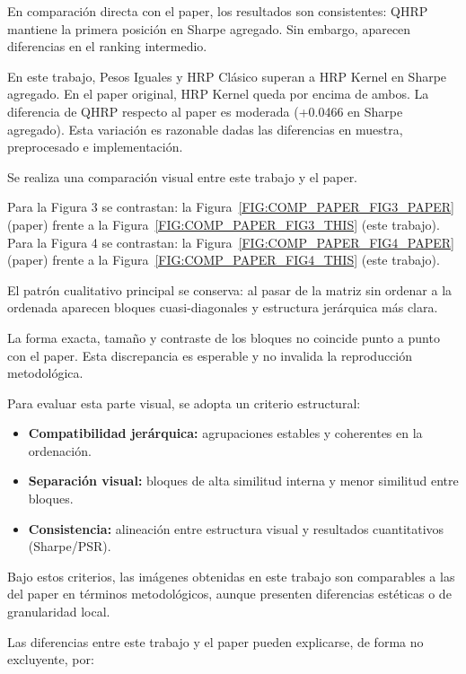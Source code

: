 En comparación directa con el paper, los resultados son consistentes: QHRP mantiene la primera posición en Sharpe agregado. Sin embargo, aparecen diferencias en el ranking intermedio.

En este trabajo, Pesos Iguales y HRP Clásico superan a HRP Kernel en Sharpe agregado. En el paper original, HRP Kernel queda por encima de ambos. La diferencia de QHRP respecto al paper es moderada (+0.0466 en Sharpe agregado). Esta variación es razonable dadas las diferencias en muestra, preprocesado e implementación.

Se realiza una comparación visual entre este trabajo y el paper.

Para la Figura 3 se contrastan: la Figura~\ref{FIG:COMP_PAPER_FIG3_PAPER} (paper) frente a la Figura~\ref{FIG:COMP_PAPER_FIG3_THIS} (este trabajo). Para la Figura 4 se contrastan: la Figura~\ref{FIG:COMP_PAPER_FIG4_PAPER} (paper) frente a la Figura~\ref{FIG:COMP_PAPER_FIG4_THIS} (este trabajo).

El patrón cualitativo principal se conserva: al pasar de la matriz sin ordenar a la ordenada aparecen bloques cuasi-diagonales y estructura jerárquica más clara.

La forma exacta, tamaño y contraste de los bloques no coincide punto a punto con el paper. Esta discrepancia es esperable y no invalida la reproducción metodológica.

Para evaluar esta parte visual, se adopta un criterio estructural:

\begin{itemize}
	\item \textbf{Compatibilidad jerárquica:} agrupaciones estables y coherentes en la ordenación.
	\item \textbf{Separación visual:} bloques de alta similitud interna y menor similitud entre bloques.
	\item \textbf{Consistencia:} alineación entre estructura visual y resultados cuantitativos (Sharpe/PSR).
\end{itemize}

Bajo estos criterios, las imágenes obtenidas en este trabajo son comparables a las del paper en términos metodológicos, aunque presenten diferencias estéticas o de granularidad local.

Las diferencias entre este trabajo y el paper pueden explicarse, de forma no excluyente, por:

